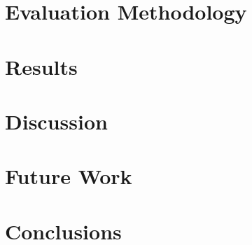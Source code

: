 \documentclass[a4paper,12pt]{article}
\begin{document}
\newpage
\section{Evaluation Methodology}
\label{sec:evaluation}


\section{Results}
\label{sec:results}


\newpage

\section{Discussion}
\label{sec:discussion}


\section{Future Work}
\label{sec:future-work}


\newpage
\section{Conclusions}
\label{sec:conclusions}


\newpage


%


%

\newpage
\appendix %


\makeatletter
\renewenvironment{theindex}
{\if@twocolumn
    \@restonecolfalse
  \else
    \@restonecoltrue
  \fi
  \twocolumn[\section{\indexname}]%
  \@mkboth{\MakeUppercase\indexname}%
  {\MakeUppercase\indexname}%
  \thispagestyle{plain}\parindent\z@
  \parskip\z@ \@plus .3\p@\relax
  \columnseprule \z@
  \columnsep 35\p@
  \let\item\@idxitem}
{\if@restonecol\onecolumn\else\clearpage\fi}
\makeatother
\printindex
\end{document}
